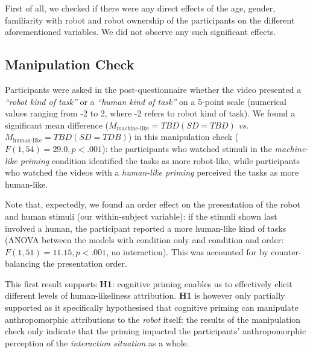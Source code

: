 \documentclass[lettersize, noapacite, twoside, HRI]{apa_HRI}
\newcommand{\ie}{\textit{i.e.}\xspace}
\newcommand{\vs}{\textit{vs.}\xspace}
\newcommand{\h}[1]{\textbf{H#1}\xspace}
\begin{document}
First of all, we checked if there were any direct effects of the age, gender,
familiarity with robot and robot ownership of the participants on the different
aforementioned variables. We did not observe any such significant effects. 



\subsection{Manipulation Check}



Participants were asked in the post-questionnaire whether the video presented a
\emph{``robot kind of task''} or a \emph{``human kind of task''} on a 5-point
scale (numerical values ranging from -2 to 2, where -2 refers to robot kind of
task). We found a significant mean difference ($M_{\text{machine-like}}=TBD (SD=TBD)$
\vs $M_{\text{human-like}}=TBD (SD=TDB)$) in this
manipulation check ($F(1,54) = 29.0, p < .001$): the participants who watched
stimuli in the \emph{machine-like priming} condition identified the tasks as more
robot-like, while participants who watched the videos with a \emph{human-like
priming} perceived the tasks as more human-like.

Note that, expectedly, we found an order effect on the presentation of the robot
and human stimuli (our within-subject variable): if the stimuli shown last
involved a human, the participant reported a more human-like kind of tasks
(ANOVA between the models with condition only and condition and order: $F(1,51)
= 11.15, p < .001$, no interaction). This was accounted for by counter-balancing
the presentation order.

This first result supports \h{1}: cognitive priming enables us to
effectively elicit different levels of human-likeliness attribution.
\h{1} is however only partially supported as it specifically hypothesised that cognitive
priming can manipulate anthropomorphic attributions to the \emph{robot} itself:
the results of the manipulation check only indicate that the priming impacted
the participants' anthropomorphic perception of the \emph{interaction
situation} as a whole.
\end{document}

